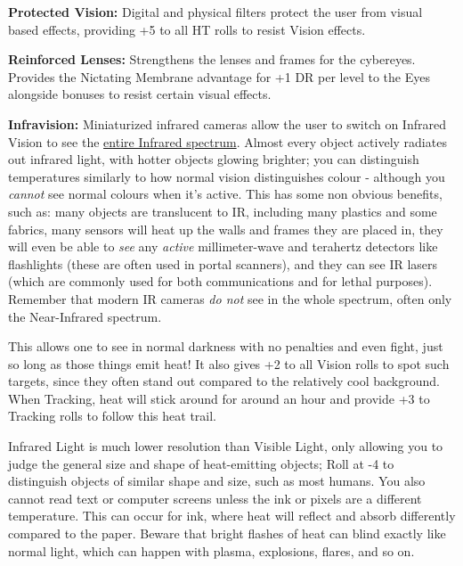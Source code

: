 \begin{multicols*}{3}
	\textbf{Protected Vision:} Digital and physical filters protect the user from visual based effects, providing +5 to all HT rolls to resist Vision effects.
	
	\textbf{Reinforced Lenses:} Strengthens the lenses and frames for the cybereyes. Provides the Nictating Membrane advantage for +1 DR per level to the Eyes alongside bonuses to resist certain visual effects.
	
	\textbf{Infravision:} Miniaturized infrared cameras allow the user to switch on Infrared Vision to see the \textcolor{Blue}{\href{https://en.wikipedia.org/wiki/Infrared}{entire Infrared spectrum}}. Almost every object actively radiates out infrared light, with hotter objects glowing brighter; you can distinguish temperatures similarly to how normal vision distinguishes colour - although you \textit{cannot} see normal colours when it's active. This has some non obvious benefits, such as: many objects are translucent to IR, including many plastics and some fabrics, many sensors will heat up the walls and frames they are placed in, they will even be able to \textit{see} any \textit{active} millimeter-wave and terahertz detectors like flashlights (these are often used in portal scanners), and they can see IR lasers (which are commonly used for both communications and for lethal purposes). Remember that modern IR cameras \textit{do not} see in the whole spectrum, often only the Near-Infrared spectrum.
	
	
	This allows one to see in normal darkness with no penalties and even fight, just so long as those things emit heat! It also gives +2 to all Vision rolls to spot such targets, since they often stand out compared to the relatively cool background. When Tracking, heat will stick around for around an hour and provide +3 to Tracking rolls to follow this heat trail.
	
	Infrared Light is much lower resolution than Visible Light, only allowing you to judge the general size and shape of heat-emitting objects; Roll at -4 to distinguish objects of similar shape and size, such as most humans. You also cannot read text or computer screens unless the ink or pixels are a different temperature. This can occur for ink, where heat will reflect and absorb differently compared to the paper. Beware that bright flashes of heat can blind exactly like normal light, which can happen with plasma, explosions, flares, and so on.
	

\end{multicols*}
